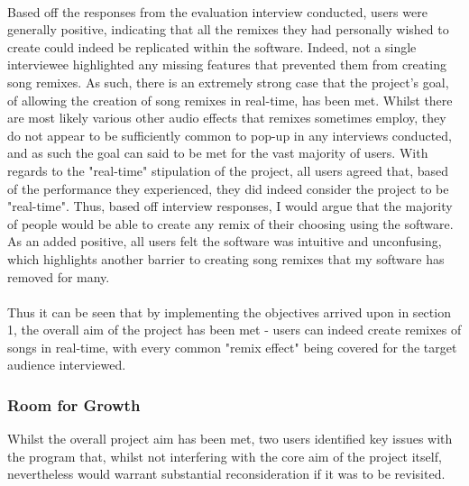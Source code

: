 \paragraph{}
Based off the responses from the evaluation interview conducted, users were generally positive, indicating that all the remixes they had personally wished to create could indeed be replicated within the software. Indeed, not a single interviewee highlighted any missing features that prevented them from creating song remixes. As such, there is an extremely strong case that the project's goal, of allowing the creation of song remixes in real-time, has been met. Whilst there are most likely various other audio effects that remixes sometimes employ, they do not appear to be sufficiently common to pop-up in any interviews conducted, and as such the goal can said to be met for the vast majority  of users. With regards to the "real-time" stipulation of the project, all users agreed that, based of the performance they experienced, they did indeed consider the project to be "real-time". Thus, based off interview responses, I would argue that the majority of people would be able to create any remix of their choosing using the software. As an added positive, all users felt the software was intuitive and unconfusing, which highlights another barrier to creating song remixes that my software has removed for many.

\paragraph{}
Thus it can be seen that by implementing the objectives arrived upon in section 1, the overall aim of the project has been met - users can indeed create remixes of songs in real-time, with every common "remix effect" being covered for the target audience interviewed.

\subsubsection*{Room for Growth}
Whilst the overall project aim has been met, two users identified key issues with the program that, whilst not interfering with the core aim of the project itself, nevertheless would warrant substantial reconsideration if it was to be revisited. 

